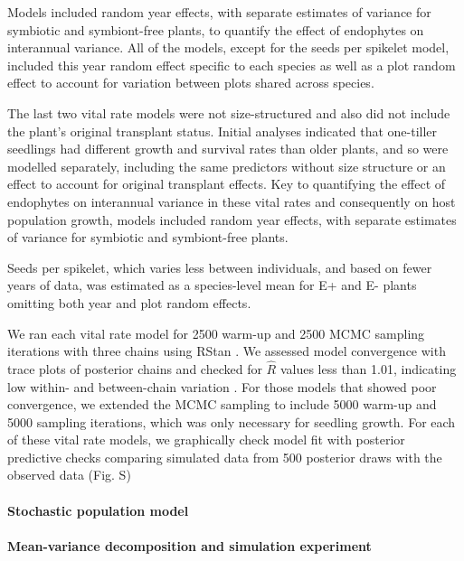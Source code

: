 \documentclass[12pt]{article}
\begin{document}
Models included random year effects, with separate estimates of variance for symbiotic and symbiont-free plants, to quantify the effect of endophytes on interannual variance. 
All of the models, except for the seeds per spikelet model, included this year random effect specific to each species as well as a plot random effect to account for variation between plots shared across species. 

The last two vital rate models were not size-structured and also did not include the plant's original transplant status. 
Initial analyses indicated that one-tiller seedlings had different growth and survival rates than older plants, and so were modelled separately, including the same predictors without size structure or an effect to account for original transplant effects.
Key to quantifying the effect of endophytes on interannual variance in these vital rates and consequently on host population growth, models included random year effects, with separate estimates of variance for symbiotic and symbiont-free plants. 

Seeds per spikelet, which varies less between individuals, and based on fewer years of data, was estimated as a species-level mean for E+ and E- plants omitting both year and plot random effects.





We ran each vital rate model for 2500 warm-up and 2500 MCMC sampling iterations with three chains using RStan \cite{rstan2022}. 
We assessed model convergence with trace plots of posterior chains and checked for $\hat{R}$ values less than 1.01, indicating low within- and between-chain variation \cite{brooks1998general, gelman2006data}. 
For those models that showed poor convergence, we extended the MCMC sampling to include 5000 warm-up and 5000 sampling iterations, which was only necessary for seedling growth. 
For each of these vital rate models, we graphically check model fit with posterior predictive checks comparing simulated data from 500 posterior draws with the observed data (Fig. S)

\paragraph*{Stochastic population model}

\paragraph*{Mean-variance decomposition and simulation experiment}
\end{document}
